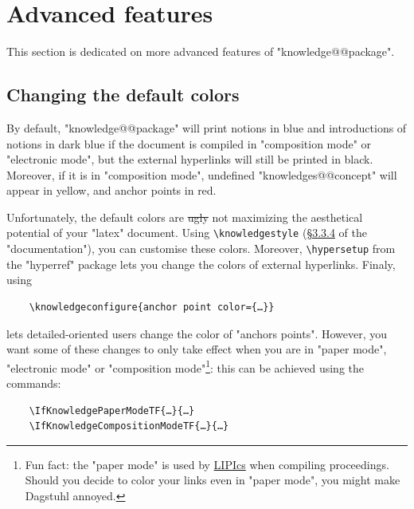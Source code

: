 \documentclass{article}
\begin{document}
\section{Advanced features}
\label{sec:advanced-features}

This section is dedicated on more advanced features of "knowledge@@package".

\subsection{Changing the default colors}

By default, "knowledge@@package" will print notions in blue and
introductions of notions in dark blue if the document is compiled
in "composition mode" or "electronic mode", but the external hyperlinks
will still be printed in black. Moreover, if it is in
"composition mode", undefined "knowledges@@concept" will appear in yellow,
and anchor points in red.

Unfortunately, the default colors are \sout{ugly} not maximizing the aesthetical potential of your "latex" document.
Using \verb|\knowledgestyle| (\href{https://distrib-coffee.ipsl.jussieu.fr/pub/mirrors/ctan/macros/latex/contrib/knowledge/knowledge.pdf#subsubsection.3.3.4}{§3.3.4} of the "documentation"), you can customise these colors. Moreover,
\verb|\hypersetup| from the "hyperref" package lets you change the colors of
external hyperlinks. Finaly, using
\begin{verbatim}
    \knowledgeconfigure{anchor point color={…}}
\end{verbatim}
lets detailed-oriented users change the color of "anchors points".
However, you want some of these changes to only take effect when you are in
"paper mode", "electronic mode" or "composition mode"\footnote{Fun fact:
the "paper mode" is used by \href{https://www.dagstuhl.de/en/publications/lipics}{LIPIcs} when compiling proceedings. Should you decide
to color your links even in "paper mode", you might make Dagstuhl annoyed.}:
this can be achieved using the commands:
\begin{verbatim}
    \IfKnowledgePaperModeTF{…}{…}
    \IfKnowledgeCompositionModeTF{…}{…}
\end{verbatim}
\end{document}
